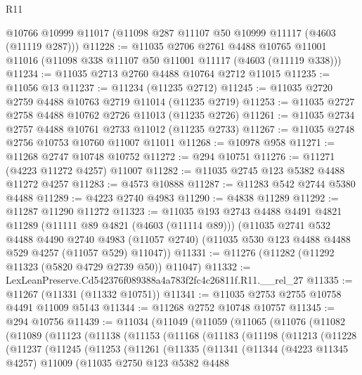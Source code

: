 \begin{lexlean}{R11}
\begin{coremodule}
    @10766
    @10999
    @11017
    (@11098 @287 @11107 @50 @10999 @11117 (@4603 (@11119 @287)))
@11228 := @11035
    @2706
    @2761
    @4488
    @10765
    @11001
    @11016
    (@11098 @338 @11107 @50 @11001 @11117 (@4603 (@11119 @338)))
@11234 := @11035 @2713 @2760 @4488 @10764 @2712 @11015
@11235 := @11056 @13
@11237 := @11234 (@11235 @2712)
@11245 := @11035 @2720 @2759 @4488 @10763 @2719 @11014 (@11235 @2719)
@11253 := @11035 @2727 @2758 @4488 @10762 @2726 @11013 (@11235 @2726)
@11261 := @11035 @2734 @2757 @4488 @10761 @2733 @11012 (@11235 @2733)
@11267 := @11035 @2748 @2756 @10753 @10760 @11007 @11011
@11268 := @10978 @958
@11271 := @11268 @2747 @10748 @10752
@11272 := @294 @10751
@11276 := @11271 (@4223 @11272 @4257) @11007
@11282 := @11035 @2745 @123 @5382 @4488 @11272 @4257
@11283 := @4573 @10888
@11287 := @11283 @542 @2744 @5380 @4488
@11289 := @4223 @2740 @4983
@11290 := @4838 @11289
@11292 := @11287 @11290 @11272
@11323 := @11035
    @193
    @2743
    @4488
    @4491
    @4821
    @11289
    (@11111 @89 @4821 (@4603 (@11114 @89)))
    (@11035
      @2741
      @532
      @4488
      @4490
      @2740
      @4983
      (@11057 @2740)
      (@11035 @530 @123 @4488 @4488 @529 @4257 (@11057 @529) @11047))
@11331 := @11276 (@11282 (@11292 @11323 (@5820 @4729 @2739 @50)) @11047)
@11332 := LexLeanPreserve.Cd542376f089388a4a783f2fc4c26811f.R11.__rel_27
@11335 := @11267 (@11331 (@11332 @10751))
@11341 := @11035 @2753 @2755 @10758 @4491 @11009 @5143
@11344 := @11268 @2752 @10748 @10757
@11345 := @294 @10756
@11439 := @11034
    (@11049
      (@11059
        (@11065
          (@11076
            (@11082
              (@11089
                (@11123
                  (@11138
                    (@11153
                      (@11168
                        (@11183
                          (@11198
                            (@11213
                              (@11228
                                (@11237
                                  (@11245
                                    (@11253
                                      (@11261
                                        (@11335
                                          (@11341
                                            (@11344
                                              (@4223 @11345 @4257)
                                              @11009
                                              (@11035
                                                @2750
                                                @123
                                                @5382
                                                @4488

\end{coremodule}
\end{lexlean}
